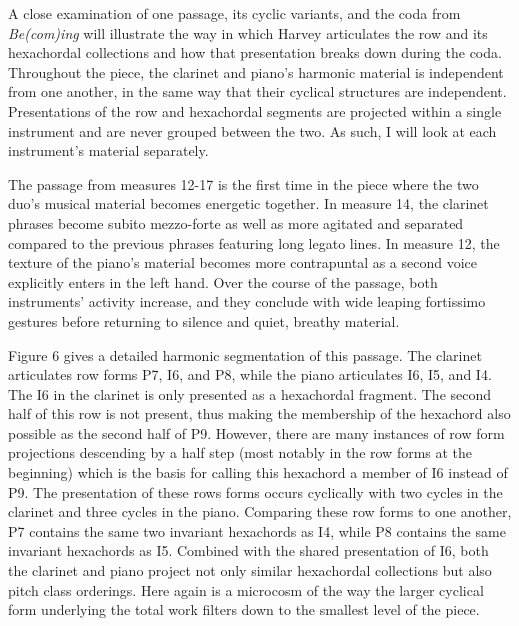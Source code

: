 A close examination of one passage, its cyclic variants, and the coda from \emph{Be(com)ing} will illustrate the way in which Harvey articulates the row and its hexachordal collections and how that presentation breaks down during the coda. Throughout the piece, the clarinet and piano's harmonic material is independent from one another, in the same way that their cyclical structures are independent. Presentations of the row and hexachordal segments are projected within a single instrument and are never grouped between the two. As such, I will look at each instrument's material separately.

The passage from measures 12-17 is the first time in the piece where the two duo's musical material becomes energetic together. In measure 14, the clarinet phrases become subito mezzo-forte as well as more agitated and separated compared to the previous phrases featuring long legato lines. In measure 12, the texture of the piano's material becomes more contrapuntal as a second voice explicitly enters in the left hand. Over the course of the passage, both instruments' activity increase, and they conclude with wide leaping fortissimo gestures before returning to silence and quiet, breathy material.

Figure 6 gives a detailed harmonic segmentation of this passage. The clarinet articulates row forms P7, I6, and P8, while the piano articulates I6, I5, and I4. The I6 in the clarinet is only presented as a hexachordal fragment. The second half of this row is not present, thus making the membership of the hexachord also possible as the second half of P9. However, there are many instances of row form projections descending by a half step (most notably in the row forms at the beginning) which is the basis for calling this hexachord a member of I6 instead of P9. The presentation of these rows forms occurs cyclically with two cycles in the clarinet and three cycles in the piano. Comparing these row forms to one another, P7 contains the same two invariant hexachords as I4, while P8 contains the same invariant hexachords as I5. Combined with the shared presentation of I6, both the clarinet and piano project not only similar hexachordal collections but also pitch class orderings. Here again is a microcosm of the way the larger cyclical form underlying the total work filters down to the smallest level of the piece.

